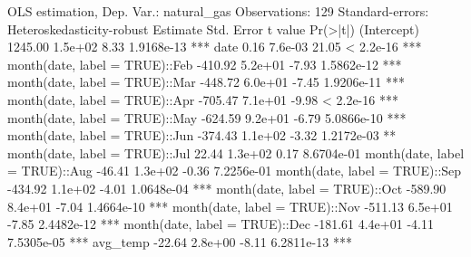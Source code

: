 \documentclass[12pt]{article}
\begin{document}
  \begin{smallcodeblock}[{}]
OLS estimation, Dep. Var.: natural_gas
Observations: 129
Standard-errors: Heteroskedasticity-robust
                               Estimate Std. Error t value   Pr(>|t|)
(Intercept)                     1245.00    1.5e+02    8.33 1.9168e-13 ***
date                               0.16    7.6e-03   21.05  < 2.2e-16 ***
month(date, label = TRUE)::Feb  -410.92    5.2e+01   -7.93 1.5862e-12 ***
month(date, label = TRUE)::Mar  -448.72    6.0e+01   -7.45 1.9206e-11 ***
month(date, label = TRUE)::Apr  -705.47    7.1e+01   -9.98  < 2.2e-16 ***
month(date, label = TRUE)::May  -624.59    9.2e+01   -6.79 5.0866e-10 ***
month(date, label = TRUE)::Jun  -374.43    1.1e+02   -3.32 1.2172e-03 **
month(date, label = TRUE)::Jul    22.44    1.3e+02    0.17 8.6704e-01
month(date, label = TRUE)::Aug   -46.41    1.3e+02   -0.36 7.2256e-01
month(date, label = TRUE)::Sep  -434.92    1.1e+02   -4.01 1.0648e-04 ***
month(date, label = TRUE)::Oct  -589.90    8.4e+01   -7.04 1.4664e-10 ***
month(date, label = TRUE)::Nov  -511.13    6.5e+01   -7.85 2.4482e-12 ***
month(date, label = TRUE)::Dec  -181.61    4.4e+01   -4.11 7.5305e-05 ***
avg_temp                         -22.64    2.8e+00   -8.11 6.2811e-13 ***
  \end{smallcodeblock}
\end{document}
